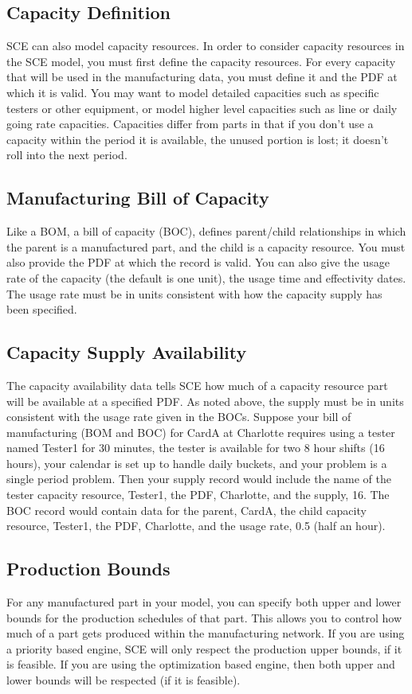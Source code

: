 \subsection{Capacity Definition}
SCE can also model capacity resources.  In order to consider capacity
resources in the SCE model, you must first define the capacity
resources.  For every capacity that will be used in the manufacturing
data, you must define it and the PDF at which it is valid.  You may
want to model detailed capacities such as specific testers or other
equipment, or model higher level capacities such as line or daily
going rate capacities.  Capacities differ from parts in that if you
don't use a capacity within the period it is available, the unused
portion is lost; it doesn't roll into the next period.

\subsection{Manufacturing Bill of Capacity}
Like a BOM, a bill of capacity (BOC), defines parent/child
relationships in which the parent is a manufactured part, and the
child is a capacity resource.  You must also provide the PDF at which
the record is valid.  You can also give the usage rate of the capacity
(the default is one unit), the usage time and effectivity dates.  The
usage rate must be in units consistent with how the capacity supply
has been specified.

\subsection{Capacity Supply Availability}
The capacity availability data tells SCE how much of a capacity
resource part will be available at a specified PDF.  As noted above,
the supply must be in units consistent with the usage rate given in
the BOCs.  Suppose your bill of manufacturing (BOM and BOC) for CardA
at Charlotte requires using a tester named Tester1 for 30 minutes, the
tester is available for two 8 hour shifts (16 hours), your calendar is
set up to handle daily buckets, and your problem is a single period
problem.  Then your supply record would include the name of the tester
capacity resource, Tester1, the PDF, Charlotte, and the supply, 16.
The BOC record would contain data for the parent, CardA, the child
capacity resource, Tester1, the PDF, Charlotte, and the usage rate,
0.5 (half an hour).

\subsection{Production Bounds}
For any manufactured part in your model, you can specify both upper
and lower bounds for the production schedules of that part.  This
allows you to control how much of a part gets produced within the
manufacturing network.  If you are using a priority based engine, SCE
will only respect the production upper bounds, if it is feasible.  If you are
using the optimization based engine, then both upper and lower 
bounds will be respected (if it is feasible).

